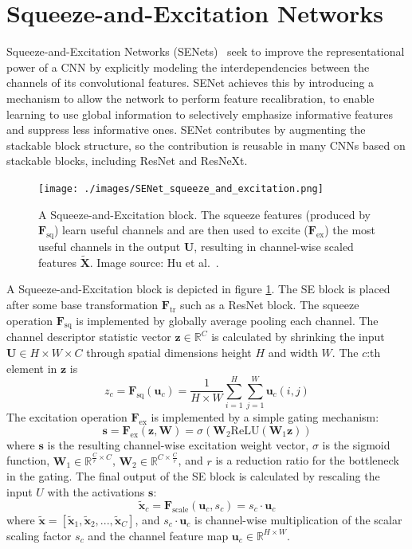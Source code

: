 \documentclass[english,twoside,openright]{HYgraduMLDS}
\newcommand{\matr}[1]{\bm{#1}}
\newcommand{\vect}[1]{\bm{#1}}
\begin{document}
\section{Squeeze-and-Excitation Networks}
\label{section:SENet}
Squeeze-and-Excitation Networks (SENets)~\cite{SENet} seek to improve the representational power of a CNN by explicitly modeling the interdependencies between the channels of its convolutional features. SENet achieves this by introducing a mechanism to allow the network to perform feature recalibration, to enable learning to use global information to selectively emphasize informative features and suppress less informative ones. SENet contributes by augmenting the stackable block structure, so the contribution is reusable in many CNNs based on stackable blocks, including ResNet and ResNeXt.

\begin{figure}[h] 
\centering
\texttt{[image: ./images/SENet\_squeeze\_and\_excitation.png]}
\caption{A Squeeze-and-Excitation block. The squeeze features (produced by $\matr{F}_{\text{sq}}$) learn useful channels and are then used to excite ($\matr{F}_{\text{ex}}$) the most useful channels in the output $\matr{U}$, resulting in channel-wise scaled features $\tilde{\matr{X}}$. Image source: Hu et al.~\cite{SENet}.}
\label{fig:SENet_block} 
\end{figure}


A Squeeze-and-Excitation block is depicted in figure \ref{fig:SENet_block}. The SE block is placed after some base transformation $\matr{F}_{\text{tr}}$ such as a ResNet block. The squeeze operation $\matr{F}_{\text{sq}}$ is implemented by globally average pooling each channel. The channel descriptor statistic vector $\vect{z} \in \mathbb{R}^C$ is calculated by shrinking the input $\matr{U} \in H \times W \times C$ through spatial dimensions height $H$ and width $W$. The $c$:th element in $\vect{z}$ is
\begin{equation}
z_c = \matr{F}_{\text{sq}}(\vect{u}_c) = \frac{1}{H \times W} \sum_{i=1}^H \sum_{j=1}^W \vect{u}_c(i,j)
\end{equation}
%
The excitation operation $\matr{F}_{\text{ex}}$ is implemented by a simple gating mechanism:
\begin{equation}
\vect{s} = \matr{F}_{\text{ex}}(\vect{z}, \matr{W}) = \sigma(\matr{W}_2 \text{ReLU}(\matr{W}_1\vect{z}))
\end{equation}
%
where $\vect{s}$ is the resulting channel-wise excitation weight vector, $\sigma$ is the sigmoid function, $\matr{W}_1 \in \mathbb{R}^{\frac{C}{r} \times C}$, $\matr{W}_2 \in \mathbb{R}^{C \times \frac{C}{r}}$, and $r$ is a reduction ratio for the bottleneck in the gating. The final output of the SE block is calculated by rescaling the input $U$ with the activations $\vect{s}$:
\begin{equation}
\tilde{\vect{x}}_c = \matr{F}_{\text{scale}}(\vect{u}_c, s_c) = s_c \cdot \vect{u}_c
\end{equation}
%
where $\tilde{\matr{x}} = [\tilde{\vect{x}}_1, \tilde{\vect{x}}_2, ... , \tilde{\vect{x}}_C]$, and $s_c \cdot \vect{u}_c$ is channel-wise multiplication of the scalar scaling factor $s_c$ and the channel feature map $\vect{u}_c \in \mathbb{R}^{H \times W}$.
\end{document}
